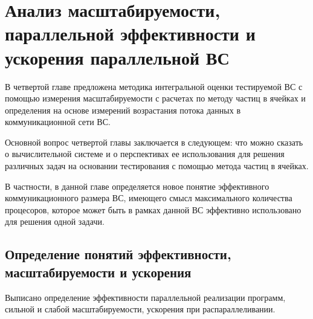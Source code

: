\chapter{Анализ масштабируемости, параллельной эффективности и ускорения параллельной ВС}
				В четвертой главе предложена методика интегральной оценки тестируемой ВС с помощью измерения масштабируемости с расчетах по методу частиц в ячейках и определения на основе измерений возрастания потока данных в коммуникационной сети ВС.

            Основной вопрос четвертой главы заключается в следующем: что можно сказать о вычислительной системе и о перспективах ее использования для решения различных задач на основании тестирования с помощью метода частиц в ячейках. 
            
            В частности, в данной главе определяется новое понятие эффективного коммуникационного размера ВС, имеющего
             смысл максимального количества процесоров, которое может быть в рамках данной ВС эффективно использовано для решения одной задачи.  
							
			\section{Определение понятий эффективности, масштабируемости и ускорения}
			
			Выписано определение эффективности параллельной реализации программ, сильной и слабой масштабируемости, ускорения при распараллеливании.
			
